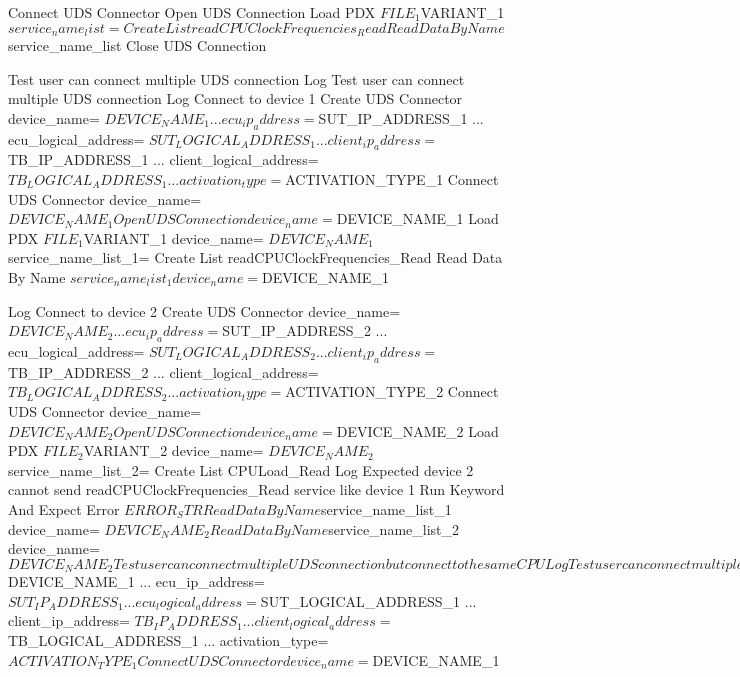 \begin{robotcode}
    Connect UDS Connector
    Open UDS Connection
    Load PDX    ${FILE_1}    ${VARIANT_1}
    ${service_name_list}=    Create List    readCPUClockFrequencies_Read
    Read Data By Name    ${service_name_list}
    Close UDS Connection

Test user can connect multiple UDS connection
    Log    Test user can connect multiple UDS connection
    Log    Connect to device 1
    Create UDS Connector    device_name= ${DEVICE_NAME_1}
    ...                     ecu_ip_address= ${SUT_IP_ADDRESS_1}
    ...                     ecu_logical_address= ${SUT_LOGICAL_ADDRESS_1}
    ...                     client_ip_address= ${TB_IP_ADDRESS_1}
    ...                     client_logical_address= ${TB_LOGICAL_ADDRESS_1}
    ...                     activation_type= ${ACTIVATION_TYPE_1}
    Connect UDS Connector   device_name= ${DEVICE_NAME_1}

    Open UDS Connection    device_name= ${DEVICE_NAME_1}
    Load PDX    ${FILE_1}    ${VARIANT_1}    device_name= ${DEVICE_NAME_1}
    ${service_name_list_1}=    Create List    readCPUClockFrequencies_Read
    Read Data By Name    ${service_name_list_1}    device_name= ${DEVICE_NAME_1}

    Log    Connect to device 2
    Create UDS Connector    device_name= ${DEVICE_NAME_2}
    ...                     ecu_ip_address= ${SUT_IP_ADDRESS_2}
    ...                     ecu_logical_address= ${SUT_LOGICAL_ADDRESS_2}
    ...                     client_ip_address= ${TB_IP_ADDRESS_2}
    ...                     client_logical_address= ${TB_LOGICAL_ADDRESS_2}
    ...                     activation_type= ${ACTIVATION_TYPE_2}
    Connect UDS Connector    device_name= ${DEVICE_NAME_2}

    Open UDS Connection    device_name= ${DEVICE_NAME_2}
    Load PDX    ${FILE_2}    ${VARIANT_2}    device_name= ${DEVICE_NAME_2}
    ${service_name_list_2}=    Create List    CPULoad_Read
    Log    Expected device 2 cannot send readCPUClockFrequencies_Read service like device 1
    Run Keyword And Expect Error    ${ERROR_STR}    Read Data By Name    ${service_name_list_1}    device_name= ${DEVICE_NAME_2}

    Read Data By Name    ${service_name_list_2}    device_name= ${DEVICE_NAME_2}

Test user can connect multiple UDS connection but connect to the same CPU
    Log    Test user can connect multiple UDS connection
    Log    Connect to device 1
    Create UDS Connector    device_name= ${DEVICE_NAME_1}
    ...                     ecu_ip_address= ${SUT_IP_ADDRESS_1}
    ...                     ecu_logical_address= ${SUT_LOGICAL_ADDRESS_1}
    ...                     client_ip_address= ${TB_IP_ADDRESS_1}
    ...                     client_logical_address= ${TB_LOGICAL_ADDRESS_1}
    ...                     activation_type= ${ACTIVATION_TYPE_1}
    Connect UDS Connector    device_name= ${DEVICE_NAME_1}
    

\end{robotcode}
